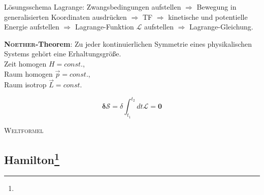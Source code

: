 \documentclass[12pt,a4paper]{article}
\renewcommand{\=}[1]{\stackrel{#1}{=}}
\theoremstyle{definition}
\theoremstyle{remark}
\begin{document}
\begin{center}
\begin{minipage}[t]{.4\linewidth}
Lösungsschema Lagrange:
Zwangsbedingungen aufstellen $\Rightarrow$ Bewegung in generalisierten Koordinaten ausdrücken $\Rightarrow$ TF $\Rightarrow$ kinetische und potentielle Energie aufstellen $\Rightarrow$ Lagrange-Funktion $\mathscr{L}$ aufstellen $\Rightarrow$  Lagrange-Gleichung.

\begin{framed}\noindent\textbf{\textsc{Noether}-Theorem}: Zu jeder kontinuierlichen Symmetrie eines physikalischen Systems gehört eine Erhaltungsgröße.\\
Zeit homogen \dotfill $H = const.$,\\
Raum homogen \dotfill $\vec{p} = const.$,\\
Raum isotrop \dotfill $\vec{L} = const.$\end{framed}

\begin{framed}
\noindent
$$\mathbf{\delta \mathcal{S} =} \delta \int_{t_1}^{t_2} dt \mathscr{L}\mathbf{= 0}$$
\begin{center}\textsc{Weltformel}\end{center}
\end{framed}
\end{minipage}
\end{center}


\subsection[Hamilton]{Hamilton\let\thefootnote\relax\footnote{}}
\end{document}
